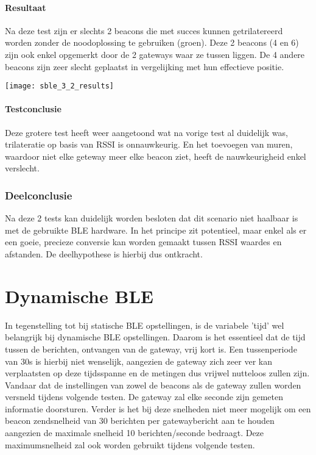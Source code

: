\paragraph{Resultaat}
\begin{minipage}{0.55\textwidth}
Na deze test zijn er slechts 2 beacons die met succes kunnen getrilatereerd worden zonder de noodoplossing te gebruiken (groen). Deze 2 beacons (4 en 6) zijn ook enkel opgemerkt door de 2 gateways waar ze tussen liggen. De 4 andere beacons zijn zeer slecht geplaatst in vergelijking met hun effectieve positie.
\end{minipage}
\hfill
\begin{minipage}{0.42\textwidth}
	\texttt{[image: sble\_3\_2\_results]}
\end{minipage}

\paragraph{Testconclusie}
Deze grotere test heeft weer aangetoond wat na vorige test al duidelijk was, trilateratie op basis van RSSI is onnauwkeurig. En het toevoegen van muren, waardoor niet elke geteway meer elke beacon ziet, heeft de nauwkeurigheid enkel verslecht.

\subsubsection{Deelconclusie}
Na deze 2 tests kan duidelijk worden besloten dat dit scenario niet haalbaar is met de gebruikte BLE hardware. In het principe zit potentieel, maar enkel als er een goeie, precieze conversie kan worden gemaakt tussen RSSI waardes en afstanden. De deelhypothese is hierbij dus ontkracht.

\section{Dynamische BLE}
In tegenstelling tot bij statische BLE opstellingen, is de variabele 'tijd' wel belangrijk bij dynamische BLE opstellingen. Daarom is het essentieel dat de tijd tussen de berichten, ontvangen van de gateway, vrij kort is. Een tussenperiode van 30s is hierbij niet wenselijk, aangezien de gateway zich zeer ver kan verplaatsten op deze tijdsspanne en de metingen dus vrijwel nutteloos zullen zijn. Vandaar dat de instellingen van zowel de beacons als de gateway zullen worden versneld tijdens volgende testen. De gateway zal elke seconde zijn gemeten informatie doorsturen. Verder is het bij deze snelheden niet meer mogelijk om een beacon zendsnelheid van 30 berichten per gatewaybericht aan te houden aangezien de maximale snelheid 10 berichten/seconde bedraagt. Deze maximumsnelheid zal ook worden gebruikt tijdens volgende testen.


